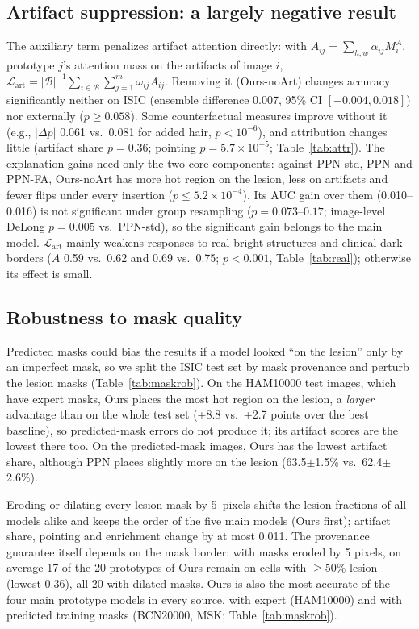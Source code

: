 \documentclass[conference]{IEEEtran}
\newcommand{\Lart}{\mathcal{L}_{\mathrm{art}}}
\begin{document}
\subsection{Artifact suppression: a largely negative result}
\label{sec:lart}
The auxiliary term penalizes artifact attention directly: with $A_{ij}=\sum_{h,w}\alpha_{ij}M^A_i$, prototype $j$'s attention mass on the artifacts of image $i$, $\Lart=|\mathcal{B}|^{-1}\sum_{i\in\mathcal{B}}\sum_{j=1}^{m}\omega_{ij}A_{ij}$. Removing it (Ours-noArt) changes accuracy significantly neither on ISIC (ensemble difference 0.007, 95\% CI $[-0.004,0.018]$) nor externally ($p\geq0.058$). Some counterfactual measures improve without it (e.g., $|\Delta p|$ 0.061 vs.\ 0.081 for added hair, $p<10^{-6}$), and attribution changes little (artifact share $p=0.36$; pointing $p=5.7\times10^{-5}$; Table~\ref{tab:attr}). The explanation gains need only the two core components: against PPN-std, PPN and PPN-FA, Ours-noArt has more hot region on the lesion, less on artifacts and fewer flips under every insertion ($p\leq5.2\times10^{-4}$). Its AUC gain over them (0.010--0.016) is not significant under group resampling ($p=0.073$--$0.17$; image-level DeLong $p=0.005$ vs.\ PPN-std), so the significant gain belongs to the main model. $\Lart$ mainly weakens responses to real bright structures and clinical dark borders ($A$ 0.59 vs.\ 0.62 and 0.69 vs.\ 0.75; $p<0.001$, Table~\ref{tab:real}); otherwise its effect is small.

\subsection{Robustness to mask quality}
\label{sec:maskrob}
Predicted masks could bias the results if a model looked ``on the lesion'' only by an imperfect mask, so we split the ISIC test set by mask provenance and perturb the lesion masks (Table~\ref{tab:maskrob}). On the HAM10000 test images, which have expert masks, Ours places the most hot region on the lesion, a \emph{larger} advantage than on the whole test set (+8.8 vs.\ +2.7 points over the best baseline), so predicted-mask errors do not produce it; its artifact scores are the lowest there too. On the predicted-mask images, Ours has the lowest artifact share, although PPN places slightly more on the lesion (63.5$\pm$1.5\% vs.\ 62.4$\pm$2.6\%).

Eroding or dilating every lesion mask by 5~pixels shifts the lesion fractions of all models alike and keeps the order of the five main models (Ours first); artifact share, pointing and enrichment change by at most 0.011. The provenance guarantee itself depends on the mask border: with masks eroded by 5 pixels, on average 17 of the 20 prototypes of Ours remain on cells with $\geq$50\% lesion (lowest 0.36), all 20 with dilated masks. Ours is also the most accurate of the four main prototype models in every source, with expert (HAM10000) and with predicted training masks (BCN20000, MSK; Table~\ref{tab:maskrob}).
\end{document}
